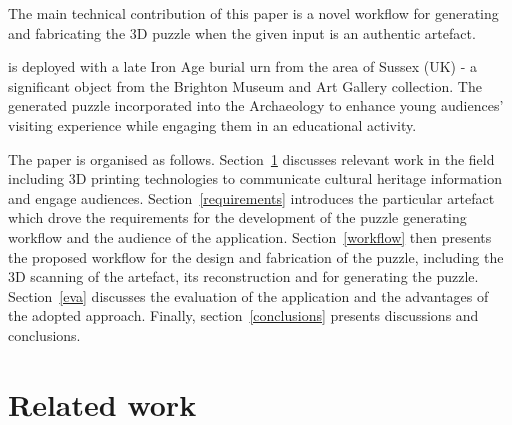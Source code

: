 \documentclass[acmlarge,screen,dvipsnames]{acmart}
\begin{document}
The main technical contribution of this paper is a novel workflow for generating
and fabricating the 3D puzzle when the given input is an
authentic  artefact. 


 is deployed with a late Iron Age burial urn
from the area of Sussex (UK) - a significant object from the Brighton
Museum and Art Gallery collection. The generated puzzle 
incorporated into the Archaeology  to enhance young audiences' visiting experience while
engaging them in an educational activity.



The paper is organised as follows. Section~\ref{related} discusses
relevant work in the field including 3D printing technologies to
communicate cultural heritage information and engage
audiences. Section~\ref{requirements} introduces the particular
artefact which drove the requirements for the development of the
puzzle generating workflow and the audience of the
application. Section~\ref{workflow} then presents the proposed
workflow for the design and fabrication of the puzzle, including the
3D scanning of the artefact, its reconstruction and  for
generating the puzzle.  Section~\ref{eva} discusses the evaluation
of the application and the advantages of the adopted
approach. Finally,
section~\ref{conclusions} presents discussions and conclusions.

\section{Related work}
\label{related}
\end{document}
